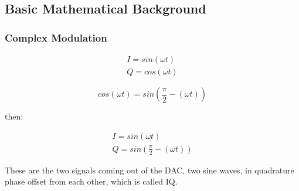 \subsection{Basic Mathematical Background}

\subsubsection{Complex Modulation}

\begin{eqnarray}
	I = sin(\omega t)\\
	Q = cos(\omega t)
\end{eqnarray}

\begin{equation}
	cos(\omega t) = sin(\frac{\pi}{2} - (\omega t))
\end{equation}

then:

\begin{eqnarray}
	I = sin(\omega t)\\
	Q = sin(\frac{\pi}{2} - (\omega t))
\end{eqnarray}

These are the two signals coming out of the DAC, two sine waves, in quadrature
phase offset from each other, which is called IQ.

